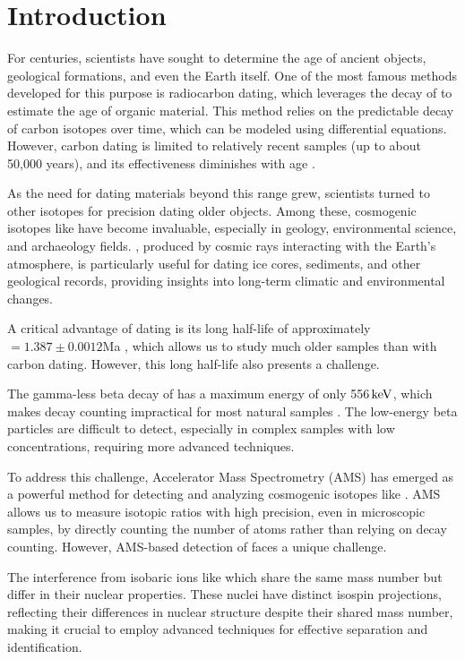 \chapter{Introduction}

For centuries, scientists have sought to determine the age of ancient objects, geological formations, and even the Earth itself. One of the most famous methods developed for this purpose is radiocarbon dating, which leverages the decay of  to estimate the age of organic material. This method relies on the predictable decay of carbon isotopes over time, which can be modeled using differential equations. However, carbon dating is limited to relatively recent samples (up to about 50,000 years), and its effectiveness diminishes with age \cite{uchicago2024carbon14}.

As the need for dating materials beyond this range grew, scientists turned to other isotopes for precision dating older objects. Among these, cosmogenic isotopes like  have become invaluable, especially in geology, environmental science, and archaeology fields. , produced by cosmic rays interacting with the Earth's atmosphere, is particularly useful for dating ice cores, sediments, and other geological records, providing insights into long-term climatic and environmental changes.

A critical advantage of  dating is its long half-life of approximately $=1.387\pm 0.0012$Ma \cite{korschinek2010, chmeleff2010}, which allows us to study much older samples than with carbon dating. However, this long half-life also presents a challenge. 

The gamma-less beta decay of  has a maximum energy of only 556$\, \mathrm{keV}$, which makes decay counting impractical for most natural samples \cite{ehmann1958}. The low-energy beta particles are difficult to detect, especially in complex samples with low  concentrations, requiring more advanced techniques.

To address this challenge, Accelerator Mass Spectrometry (AMS) has emerged as a powerful method for detecting and analyzing cosmogenic isotopes like . AMS allows us to measure isotopic ratios with high precision, even in microscopic samples, by directly counting the number of  atoms rather than relying on decay counting. However, AMS-based detection of  faces a unique challenge.

The interference from isobaric ions like 
which share the same mass number but differ in their nuclear properties. These nuclei have distinct isospin projections, reflecting their differences in nuclear structure despite their shared mass number, making it crucial to employ advanced techniques for effective separation and identification.


